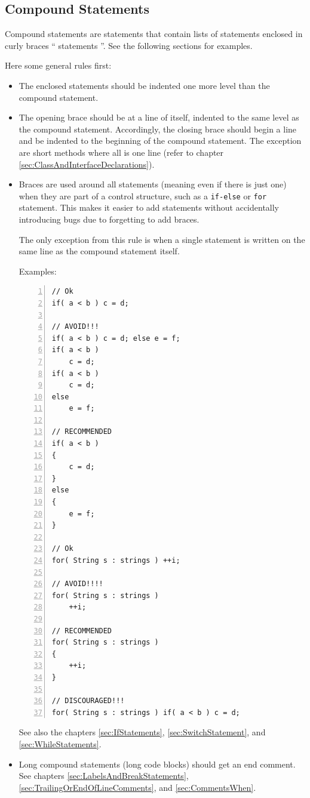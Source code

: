 \documentclass[12pt,a4paper,titlepage, parskip=half, headsepline, footsepline, cleardoubleplain]{scrbook}
\begin{document}
\subsection{Compound Statements}\label{sec:CompoundStatements}
Compound statements are statements that contain lists of statements enclosed in curly braces “{ statements }”. See the following sections for examples.

Here some general rules first:
\begin{itemize}
\item{The enclosed statements should be indented one more level than the compound statement.}
\item{The opening brace should be at a line of itself, indented to the same level as the compound statement.
Accordingly, the closing brace should begin a line and be indented to the beginning of the compound statement. The exception are short methods where all is one line (refer to chapter \vref{sec:ClassAndInterfaceDeclarations})}.
\item{Braces are used around all statements (meaning even if there is just one) when they are part of a control structure, such as a \lstinline|if-else| or \lstinline|for| statement. This makes it easier to add statements without accidentally introducing bugs due to forgetting to add braces.

The only exception from this rule is when a single statement is written on the same line as the compound statement itself.

Examples:

\begin{lstlisting}[numbers=left]
// Ok
if( a < b ) c = d;

// AVOID!!!
if( a < b ) c = d; else e = f;
if( a < b )
    c = d;
if( a < b )
    c = d;
else
    e = f;

// RECOMMENDED
if( a < b )
{
    c = d;
}
else
{
    e = f;
}

// Ok
for( String s : strings ) ++i;

// AVOID!!!!
for( String s : strings )
    ++i;

// RECOMMENDED
for( String s : strings )
{
    ++i;
}

// DISCOURAGED!!!
for( String s : strings ) if( a < b ) c = d;
\end{lstlisting}

See also the chapters \ref{sec:IfStatements}, \ref{sec:SwitchStatement}, and \ref{sec:WhileStatements}.}

\item{Long compound statements (long code blocks) should get an end comment. See chapters \ref{sec:LabelsAndBreakStatements}, \ref{sec:TrailingOrEndOfLineComments}, and \ref{sec:CommentsWhen}.} 
\end{itemize}
\end{document}
